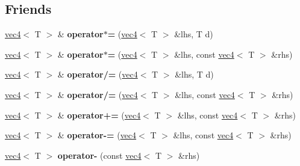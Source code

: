 \subsection*{Friends}
\begin{DoxyCompactItemize}
\item 
\hypertarget{classnv_1_1vec4_ae65c5a39b3a0919fbd11005040b83d93}{}\label{classnv_1_1vec4_ae65c5a39b3a0919fbd11005040b83d93} 
\hyperlink{classnv_1_1vec4}{vec4}$<$ T $>$ \& {\bfseries operator$\ast$=} (\hyperlink{classnv_1_1vec4}{vec4}$<$ T $>$ \&lhs, T d)
\item 
\hypertarget{classnv_1_1vec4_adb31e94e1ef43e088572ee682aa5ab6c}{}\label{classnv_1_1vec4_adb31e94e1ef43e088572ee682aa5ab6c} 
\hyperlink{classnv_1_1vec4}{vec4}$<$ T $>$ \& {\bfseries operator$\ast$=} (\hyperlink{classnv_1_1vec4}{vec4}$<$ T $>$ \&lhs, const \hyperlink{classnv_1_1vec4}{vec4}$<$ T $>$ \&rhs)
\item 
\hypertarget{classnv_1_1vec4_a0c2ce7247eaf12932a608e657e3aec52}{}\label{classnv_1_1vec4_a0c2ce7247eaf12932a608e657e3aec52} 
\hyperlink{classnv_1_1vec4}{vec4}$<$ T $>$ \& {\bfseries operator/=} (\hyperlink{classnv_1_1vec4}{vec4}$<$ T $>$ \&lhs, T d)
\item 
\hypertarget{classnv_1_1vec4_a19980a11fa7178d3cb0d8ca2380fbd8e}{}\label{classnv_1_1vec4_a19980a11fa7178d3cb0d8ca2380fbd8e} 
\hyperlink{classnv_1_1vec4}{vec4}$<$ T $>$ \& {\bfseries operator/=} (\hyperlink{classnv_1_1vec4}{vec4}$<$ T $>$ \&lhs, const \hyperlink{classnv_1_1vec4}{vec4}$<$ T $>$ \&rhs)
\item 
\hypertarget{classnv_1_1vec4_abea67e054b76ea133d0b20187cb6da7e}{}\label{classnv_1_1vec4_abea67e054b76ea133d0b20187cb6da7e} 
\hyperlink{classnv_1_1vec4}{vec4}$<$ T $>$ \& {\bfseries operator+=} (\hyperlink{classnv_1_1vec4}{vec4}$<$ T $>$ \&lhs, const \hyperlink{classnv_1_1vec4}{vec4}$<$ T $>$ \&rhs)
\item 
\hypertarget{classnv_1_1vec4_a54e1e773b4df6a71b19eb4b5781a7ead}{}\label{classnv_1_1vec4_a54e1e773b4df6a71b19eb4b5781a7ead} 
\hyperlink{classnv_1_1vec4}{vec4}$<$ T $>$ \& {\bfseries operator-\/=} (\hyperlink{classnv_1_1vec4}{vec4}$<$ T $>$ \&lhs, const \hyperlink{classnv_1_1vec4}{vec4}$<$ T $>$ \&rhs)
\item 
\hypertarget{classnv_1_1vec4_a8cc817f95174f06a8388b7fc2b8c2d3f}{}\label{classnv_1_1vec4_a8cc817f95174f06a8388b7fc2b8c2d3f} 
\hyperlink{classnv_1_1vec4}{vec4}$<$ T $>$ {\bfseries operator-\/} (const \hyperlink{classnv_1_1vec4}{vec4}$<$ T $>$ \&rhs)
\item 
\hypertarget{classnv_1_1vec4_a5ddc069514681de9e350c3f082431fd7}{}\label{classnv_1_1vec4_a5ddc069514681de9e350c3f082431fd7} 

\end{DoxyCompactItemize}
